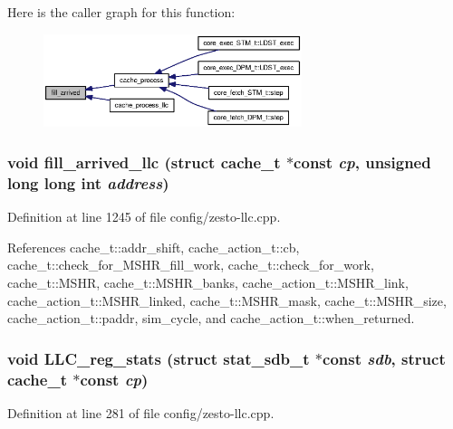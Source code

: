 Here is the caller graph for this function:\nopagebreak
\begin{figure}[H]
\begin{center}
\leavevmode
\includegraphics[width=214pt]{zesto-cache_8h_4d5f99649851ca3db130a4a6228a1f35_icgraph}
\end{center}
\end{figure}
\subsubsection[{fill\_\-arrived\_\-llc}]{\setlength{\rightskip}{0pt plus 5cm}void fill\_\-arrived\_\-llc (struct {\bf cache\_\-t} $\ast$const  {\em cp}, \/  unsigned long long int {\em address})}\label{zesto-cache_8h_f1f903df28f067bfd63f3145c04a5870}




Definition at line 1245 of file config/zesto-llc.cpp.

References cache\_\-t::addr\_\-shift, cache\_\-action\_\-t::cb, cache\_\-t::check\_\-for\_\-MSHR\_\-fill\_\-work, cache\_\-t::check\_\-for\_\-work, cache\_\-t::MSHR, cache\_\-t::MSHR\_\-banks, cache\_\-action\_\-t::MSHR\_\-link, cache\_\-action\_\-t::MSHR\_\-linked, cache\_\-t::MSHR\_\-mask, cache\_\-t::MSHR\_\-size, cache\_\-action\_\-t::paddr, sim\_\-cycle, and cache\_\-action\_\-t::when\_\-returned.
\subsubsection[{LLC\_\-reg\_\-stats}]{\setlength{\rightskip}{0pt plus 5cm}void LLC\_\-reg\_\-stats (struct {\bf stat\_\-sdb\_\-t} $\ast$const  {\em sdb}, \/  struct {\bf cache\_\-t} $\ast$const  {\em cp})}\label{zesto-cache_8h_0a1aa47236ccba0a1d5e5818052a830d}




Definition at line 281 of file config/zesto-llc.cpp.

